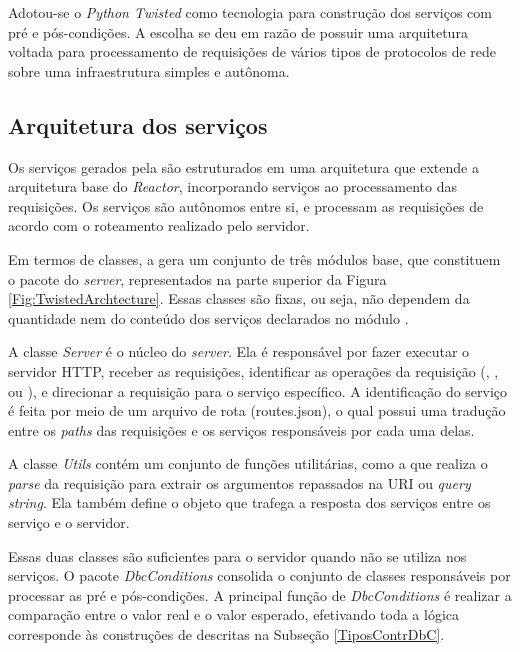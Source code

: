 Adotou-se o \framework{} \emph{Python Twisted}\cite{fettig2005twisted} como tecnologia para
construção dos serviços com pré e pós-condições. A escolha se deu em razão de
\twisted{} possuir uma arquitetura voltada para processamento de requisições de vários
tipos de protocolos de rede sobre uma infraestrutura simples e autônoma. 

\subsection{Arquitetura dos serviços \twisted{}}
\label{ArquiteturaTwisted}

Os serviços \twisted{} gerados pela \neoidl{} são estruturados em uma
arquitetura que extende a arquitetura base do \twisted{} \emph{Reactor},
incorporando serviços ao processamento das requisições. Os serviços são autônomos entre si, e
processam as requisições de acordo com o roteamento realizado pelo servidor.

Em termos de classes, a \neoidl{} gera um conjunto de três módulos base,
que constituem o pacote do \twisted{} \textit{server}, representados na
parte superior da Figura \ref{Fig:TwistedArchtecture}. Essas classes são fixas,
ou seja, não dependem da quantidade nem do conteúdo dos serviços declarados no
módulo \neoidl{}.

A classe \emph{Server} é o núcleo do \twisted{} \textit{server}. Ela é
responsável por fazer executar o servidor HTTP, receber as requisições,
identificar as operações da requisição (, ,  ou ), e
direcionar a requisição para o serviço específico. A identificação do serviço é
feita por meio de um arquivo de rota (routes.json), o qual possui uma tradução
entre os \emph{paths} das requisições e os serviços responsáveis por cada uma
delas.

A classe \emph{Utils} contém um conjunto de funções utilitárias, como a que
realiza o \textit{parse} da requisição para extrair os argumentos repassados
na URI ou \textit{query string}. Ela também define o objeto que trafega a
resposta dos serviços entre os serviço e o servidor.

Essas duas classes são suficientes para o servidor quando não se utiliza
\designbycontract{} nos serviços. O pacote
\emph{DbcConditions} consolida o conjunto de classes res\-pon\-sá\-veis por
processar as pré e pós-condições. A principal função de \emph{DbcConditions} é realizar a
comparação entre o valor real e o valor esperado, efetivando toda a
lógica corresponde às construções de \designbycontract{} descritas na Subseção
\ref{TiposContrDbC}.

